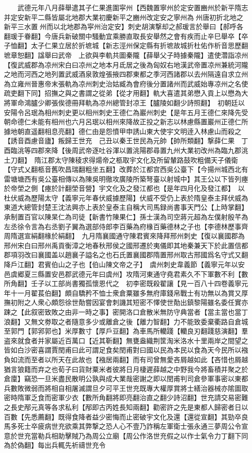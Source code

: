 　　武德元年八月薛舉遣其子仁果進圍寜州【西魏置寧州於定安置豳州於新平隋志并定安新平二縣皆屬北地郡大業初慶新平之豳州改定安之寧州為州唐初折北地之新平三水置州而以北地郡為寜州治定安】刺史胡演撃却之郝瑗言於舉曰【郝呼各翻瑗于眷翻】今唐兵新破關中騷動宜乘勝直取長安舉然之會有疾而止辛巳舉卒【卒子恤翻】太子仁果立居於折墌城【新志涇州保定縣有折墌故城折杜佑作析音思歷翻墌章恕翻】諡舉曰武帝　上欲與李軌共圖秦隴【薛舉父子時據秦隴】遣使濳詣凉州【復武威郡為凉州宋白曰凉州之地本月氐居之後為匈奴右地漢武帝置凉州兼統河隴之地而河西之地列置武威酒泉敦煌張掖四郡東都之季河西諸郡以去州隔遠自求立州為立雍州晉惠帝末張軌為凉州刺史治姑臧為會府後分置諸州而武威始專凉州之名使疏吏翻下同】招撫之與之書謂之從弟【從才用翻】軌大喜遣其弟懋入貢上以懋為大將軍命鴻臚少卿張俟德冊拜軌為凉州總管封凉王【臚陵如翻少詩照翻】　初朝廷以安陽令呂珉為相州刺史更以相州刺史王德仁為巖州刺史【是年五月王德仁來降先受朝命德仁未能有相州也六月呂珉以相州來降故正投之新志以林慮縣置巖州正德仁所據地朝直遥翻相息亮翻】德仁由是怨憤甲申誘山東大使宇文明逹入林慮山而殺之【誘音酉慮音廬】叛歸王世充　己丑以秦王世民為元帥【帥所類翻】撃薛仁果　丁酉臨洮等四郡來降【後周武帝逐吐谷渾以置洮陽郡尋置九州大業初改州為臨九郡洮土刀翻】　隋江郡太守陳稜求得煬帝之柩取宇文化及所留輦路鼓吹粗備天子儀衛【守式乂翻柩音舊吹昌瑞翻粗坐五翻】改葬於江都宫西吳公臺下【今揚州城西北有雷塘塘西有吳公臺相傳以為陳吳明徹攻廣陵所築弩臺以射城中】其王公以下皆列瘞於帝塋之側【瘞於計翻塋音營】宇文化及之發江都也【是年四月化及發江都】　以杜伏威為歷陽太守【義寧元年春伏威據歷陽】伏威不受仍上表於隋皇泰主拜伏威為東道大總管封楚王沈法興亦上表於皇泰主自稱大司馬録尚書事天門公【上時掌翻】承制置百官以陳杲仁為司徒【新書竹陳果仁】孫士漢為司空蔣元超為左僕射殷芊為左丞徐令言為右丞劉子翼為選部侍郎李百藥為府椽百藥德林之子也【李德林歷事齊周隋選宣絹翻椽於絹翻】　九月隋襄國通守陳君賓來降拜邢州刺史【復以襄國郡為邢州宋白曰邢州禹貢衡漳之地春秋邢侯之國邢遷於夷儀即其地秦兼天下於此置信都郡項羽改曰襄國盖以趙襄子謚名之也石氏置襄國郡隋置邢州取古邢國爲名守式又翻降戶江翻】君賓伯山之子也【伯山陳文帝之子】　虞州刺史韋義節【義寧元年以安邑虞郷夏三縣置安邑郡武德元年曰虞州】攻隋河東通守堯君素久不下軍數不利【數所角翻】壬子以工部尚書獨孤懷恩代之　初李密既殺翟讓【見一百八十四卷義寧元年十一月翟萇伯翻】頗自驕矜不恤士衆倉粟雖多無府庫錢帛戰士有功無以為賞又厚撫初附之人衆心頗怨徐世勣嘗因宴會刺譏其短密不懌使世勣出鎮黎陽雖名委任實亦踈之【此叙密致敗之由非一時之事】密開洛口倉散米無防守典當者【當主當也當丁浪翻】又無文劵取之者隨意多少或離倉之後【離力智翻】力不能致委棄衢路自倉城至郭門【郭郛郭也】米厚數寸【厚戶豆翻】為車馬所轥踐【轥良刃翻踐慈演翻】羣盗來就食者并家屬近百萬口【近其靳翻】無甕盎織荆筐淘米洛水十里兩岸之間望之皆如白沙密喜謂賈閏甫曰此可謂足食矣閏甫對曰國以民為本民以食為天今民所以襁負如流而至者以所天在此故也【襁居兩翻】而有司曾無愛吝屑越如此【吝惜也屑越猶言狼籍而弃之也荀子曰貨財粟米者彼將日月棲遲薛越之中野我今將畜積并聚之於倉廩】竊恐一旦米盡民散明公孰與成大業哉密謝之即以閏甫判司倉參軍事密以東都兵數敗微弱而將相自相屠滅謂旦夕可平王世充既專大權厚賞將士繕治器械亦隂圖取密時隋軍乏食而密軍少衣【數所角翻將即亮翻治直之翻少詩沼翻】世充請交易密難之長史邴元真等各求私利【邴即古丙姓長知兩翻】勸密許之先是東都人歸密者日以百數【先悉薦翻】既得食降者益少密悔而止密破宇文化及還【還從宣翻】其勁卒良馬多死士卒疲病世充欲乘其弊撃之恐人心不壹乃詐稱左軍衛士張永通三夢周公令宣意於世充當勒兵相助擊賊乃為周公立廟【周公作洛世充假之以作士氣令力丁翻下同為於偽翻】每出兵輒先祈禱世充令